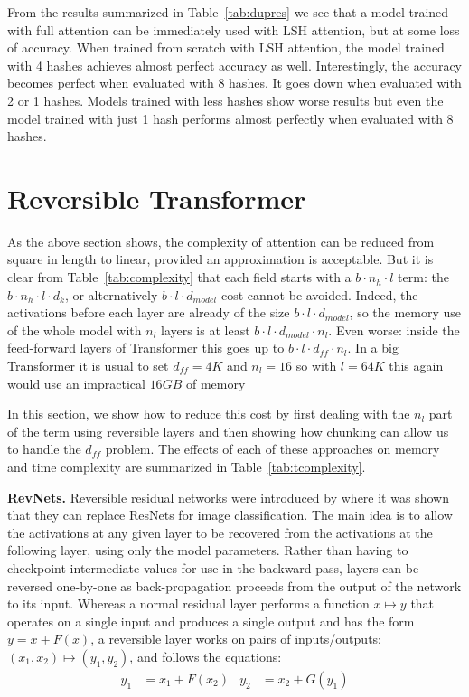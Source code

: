 \documentclass{article} \usepackage{iclr2020_conference,times}
\renewcommand{\paragraph}[1]{\textbf{#1}}
\begin{document}
From the results summarized in Table~\ref{tab:dupres} we see that
a model trained with full attention can be immediately used with LSH
attention, but at some loss of accuracy. When trained from scratch
with LSH attention, the model trained with 4 hashes achieves almost
perfect accuracy as well. Interestingly, the accuracy becomes perfect
when evaluated with 8 hashes. It goes down when evaluated with 2 or 1
hashes. Models trained with less hashes show worse results but even
the model trained with just 1 hash performs almost perfectly when
evaluated with 8 hashes.


\section{Reversible Transformer} \label{sec:reversible}

As the above section shows, the complexity of attention can be reduced
from square in length to linear, provided an approximation is acceptable.
But it is clear from Table~\ref{tab:complexity} that each field starts
with a $b\cdot n_h\cdot l$ term: the $b\cdot n_h\cdot l\cdot d_k$, 
or alternatively $b\cdot l\cdot d_{model}$ cost
cannot be avoided. Indeed, the activations before each layer are already
of the size $b\cdot l\cdot d_{model}$, so the memory use of the whole model with $n_l$
layers is at least $b\cdot l\cdot d_{model}\cdot n_l$. Even worse: inside the feed-forward layers of 
Transformer this goes up to $b\cdot l\cdot d_{ff}\cdot n_l$. In a big Transformer
it is usual to set $d_{ff}=4K$ and $n_l=16$ so with $l=64K$ this again
would use an impractical $16GB$ of memory

In this section, we show how to reduce this cost by first dealing with the
$n_l$ part of the term using reversible layers and then showing how chunking
can allow us to handle the $d_{ff}$ problem.
The effects of each of these approaches on memory and time complexity are summarized in Table~\ref{tab:tcomplexity}.


\paragraph{RevNets.}
Reversible residual networks were introduced by \citet{gomez2017reversible} where it was shown
that they can replace ResNets for image classification.
The main idea is to allow the activations at any given layer to be recovered from the activations at the following layer, using only the model parameters. Rather than having to checkpoint intermediate values for use in the backward pass, layers can be reversed one-by-one as back-propagation proceeds from the output of the network to its input. Whereas a normal residual layer performs a function $x \mapsto y$ that operates on a single input and produces a single output and has the form $y = x + F(x)$, a reversible layer works on pairs of inputs/outputs: $(x_1, x_2) \mapsto (y_1, y_2)$, and follows the equations:
\begin{align}
    y_1 &= x_1 + F(x_2) &
    y_2 &= x_2 + G(y_1)
\end{align}
\end{document}
